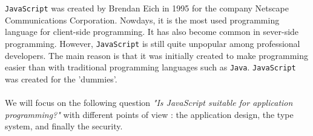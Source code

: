 \texttt{JavaScript} was created by Brendan Eich in 1995 for the company Netscape Communications Corporation. Nowdays, it is the most used programming language for client-side programming. It has also become common in sever-side programming. However, \texttt{JavaScript} is still quite unpopular among professional developers. The main reason is that it was initially created to make programming easier than with traditional programming languages such as \texttt{Java}. \texttt{JavaScript} was created for the 'dummies'.
\paragraph{}
We will focus on the following question \emph{"Is JavaScript suitable for application programming?"} with different points of view : the application design, the type system, and finally the security. 
